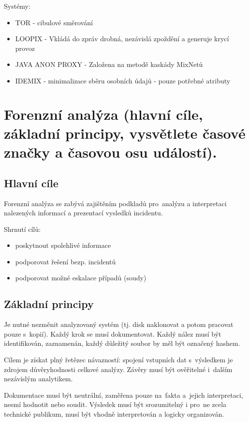 Systémy:
\begin{itemize}
    \item TOR - cibulové směrování
    \item LOOPIX - Vkládá do zpráv drobná, nezávislá zpoždění a generuje krycí provoz
    \item JAVA ANON PROXY - Založena na metodě kaskády MixNetů
    \item IDEMIX - minimalizace sběru osobních údajů - pouze potřebné atributy
\end{itemize}

\clearpage
\section{Forenzní analýza (hlavní cíle, základní principy, vysvětlete časové značky a časovou osu událostí).}
\subsection{Hlavní cíle}

Forenzní analýza se zabývá zajištěním podkladů pro~analýzu a interpretaci nalezených informací a prezentací vysledků incidentu.

Shrnutí cílů:
    \begin{itemize}
        \item poskytnout spolehlivé informace
        \item podporovat řešení bezp. incidentů
        \item podporovat možné eskalace případů (soudy)
    \end{itemize}

\subsection{Základní principy}

Je nutné nezměnit analyzovaný systém (tj. disk naklonovat a potom pracovat pouze s~kopií).
Každý krok se musí dokumentovat.
Každý nález musí být identifikován, zaznamenán, každý důležitý soubor by měl být označený hashem.

Cílem je získat plný řetězec návazností: spojení vstupních dat s~výsledkem je zdrojem důvěryhodnosti celkové analýzy.
Závěry musí být ověřitelné i~dalším nezávislým analytikem.

Dokumentace musí být neutrální, zaměřena pouze na~fakta a~jejich interpretaci, nesmí hodnotit nebo soudit.
Výsledek musí být srozumitelný i pro~ne zcela technické publikum, musí být vhodně interpretován a logicky organizován.

